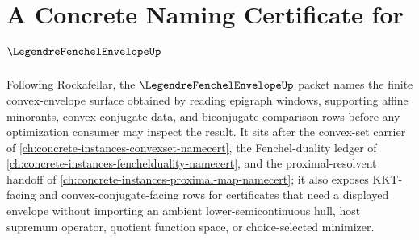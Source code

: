 \chapter{A Concrete Naming Certificate for $\LegendreFenchelEnvelopeUp$}
\label{ch:concrete-instances-legendre-fenchel-envelope-namecert}

Following Rockafellar, the $\LegendreFenchelEnvelopeUp$ packet names the finite convex-envelope surface obtained by reading epigraph windows, supporting affine minorants, convex-conjugate data, and biconjugate comparison rows before any optimization consumer may inspect the result. It sits after the convex-set carrier of \autoref{ch:concrete-instances-convexset-namecert}, the Fenchel-duality ledger of \autoref{ch:concrete-instances-fenchelduality-namecert}, and the proximal-resolvent handoff of \autoref{ch:concrete-instances-proximal-map-namecert}; it also exposes KKT-facing and convex-conjugate-facing rows for certificates that need a displayed envelope without importing an ambient lower-semicontinuous hull, host supremum operator, quotient function space, or choice-selected minimizer.

